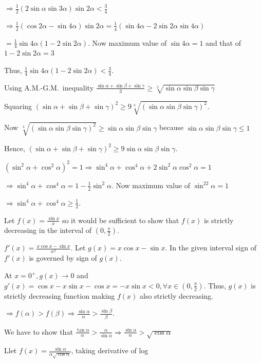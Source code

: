   $\Rightarrow \frac{1}{2}(2\sin\alpha\sin3\alpha)\sin2\alpha < \frac{3}{4}$

  $\Rightarrow \frac{1}{2}(\cos2\alpha - \sin4\alpha)\sin2\alpha = \frac{1}{4}(\sin4\alpha -
  2\sin2\alpha\sin4\alpha)$

  $= \frac{1}{4}\sin4\alpha(1 - 2\sin2\alpha)$. Now maximum value of $\sin4\alpha = 1$ and that of $1 -
  2\sin2\alpha = 3$

  Thus, $\frac{1}{4}\sin4\alpha(1 - 2\sin2\alpha) < \frac{3}{4}$.
\item Using A.M.-G.M.\ inequality $\frac{\sin\alpha + \sin\beta + \sin\gamma}{3} \geq
  \sqrt[2]{\sin\alpha\sin\beta\sin\gamma}$

  Squaring $(\sin\alpha + \sin\beta + \sin\gamma)^2\geq 9\sqrt[3]{(\sin\alpha\sin\beta\sin\gamma)^2}$.

  Now $\sqrt[3]{(\sin\alpha\sin\beta\sin\gamma)^2} \geq \sin\alpha\sin\beta\sin\gamma$ because
  $\sin\alpha\sin\beta\sin\gamma\leq 1$

  Hence, $(\sin\alpha + \sin\beta + \sin\gamma)^2\geq 9\sin\alpha\sin\beta\sin\gamma$.
\item $\left(\sin^2\alpha + \cos^2\alpha\right)^2 = 1 \Rightarrow \sin^4\alpha + \cos^4\alpha +
  2\sin^2\alpha\cos^2\alpha = 1$

  $\Rightarrow \sin^4\alpha + \cos^4\alpha = 1 - \frac{1}{2}\sin^2\alpha$. Now maximum value of
  $\sin^22\alpha = 1$

  $\Rightarrow \sin^4\alpha + \cos^4\alpha \geq \frac{1}{2}$.
\item Let $f(x) = \frac{\sin x}{x}$ so it would be sufficient to show that $f(x)$ is strictly decreasing in
  the interval of $\left(0, \frac{\pi}{2}\right)$.

  $f'(x) = \frac{x\cos x - \sin x}{x^2}$. Let $g(x) = x\cos x - \sin x$. In the given interval sign of
  $f'(x)$ is governed by sign of $g(x)$.

  At $x = 0^+, g(x)\rightarrow 0$ and $g'(x) = \cos x -x\sin x - \cos x = -x\sin x < 0, \forall x\in\left(0,
  \frac{\pi}{2}\right)$. Thus, $g(x)$ is strictly decreasing function making $f(x)$ also strictly
  decreasing.

  $\Rightarrow f(\alpha) > f(\beta)\Rightarrow\frac{\sin\alpha}{\alpha} > \frac{\sin\beta}{\beta}$.
\item We have to show that $\frac{\tan\alpha}{\alpha} > \frac{\alpha}{\sin\alpha} \Rightarrow
  \frac{\sin\alpha}{\alpha} > \sqrt{\cos\alpha}$

  Llet $f(x) = \frac{\sin\alpha}{\alpha\sqrt{\cos\alpha}}$, taking derivative of log

